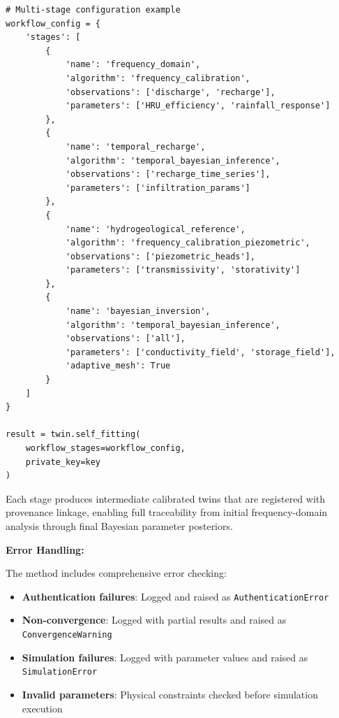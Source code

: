 \begin{verbatim}
# Multi-stage configuration example
workflow_config = {
    'stages': [
        {
            'name': 'frequency_domain',
            'algorithm': 'frequency_calibration',
            'observations': ['discharge', 'recharge'],
            'parameters': ['HRU_efficiency', 'rainfall_response']
        },
        {
            'name': 'temporal_recharge',
            'algorithm': 'temporal_bayesian_inference',
            'observations': ['recharge_time_series'],
            'parameters': ['infiltration_params']
        },
        {
            'name': 'hydrogeological_reference',
            'algorithm': 'frequency_calibration_piezometric',
            'observations': ['piezometric_heads'],
            'parameters': ['transmissivity', 'storativity']
        },
        {
            'name': 'bayesian_inversion',
            'algorithm': 'temporal_bayesian_inference',
            'observations': ['all'],
            'parameters': ['conductivity_field', 'storage_field'],
            'adaptive_mesh': True
        }
    ]
}

result = twin.self_fitting(
    workflow_stages=workflow_config,
    private_key=key
)
\end{verbatim}

Each stage produces intermediate calibrated twins that are registered with provenance linkage, enabling full traceability from initial frequency-domain analysis through final Bayesian parameter posteriors.

\textbf{Error Handling:}

The method includes comprehensive error checking:

\begin{itemize}
    \item \textbf{Authentication failures}: Logged and raised as \texttt{AuthenticationError}
    \item \textbf{Non-convergence}: Logged with partial results and raised as \texttt{ConvergenceWarning}
    \item \textbf{Simulation failures}: Logged with parameter values and raised as \texttt{SimulationError}
    \item \textbf{Invalid parameters}: Physical constraints checked before simulation execution
\end{itemize}
